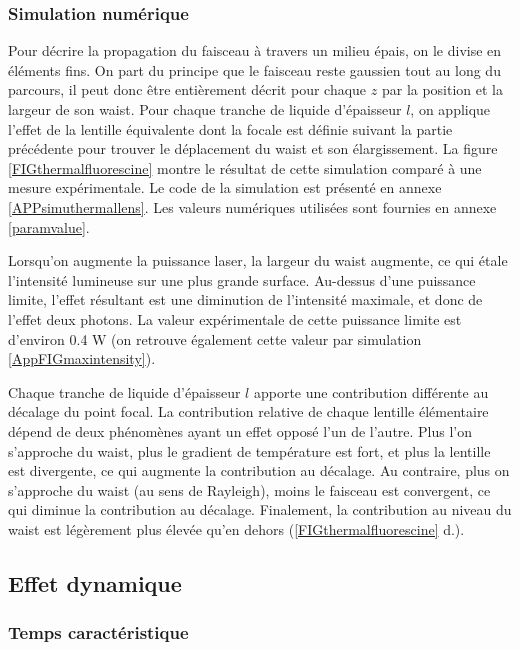 \subsubsection{Simulation numérique}\label{simuthermallens}

Pour décrire la propagation du faisceau à travers un milieu épais, on le divise en éléments fins.
On part du principe que le faisceau reste gaussien tout au long du parcours, il peut donc être entièrement décrit pour chaque $z$ par la position et la largeur de son waist. Pour chaque tranche de liquide d'épaisseur $l$, on applique l'effet de la lentille équivalente dont la focale est définie suivant la partie précédente pour trouver le déplacement du waist et son élargissement. La figure \ref{FIGthermalfluorescine} montre le résultat de cette simulation comparé à une mesure expérimentale. Le code de la simulation est présenté en annexe \ref{APPsimuthermallens}. Les valeurs numériques utilisées sont fournies en annexe \ref{paramvalue}.

Lorsqu'on augmente la puissance laser, la largeur du waist augmente, ce qui étale l'intensité lumineuse sur une plus grande surface. Au-dessus d'une puissance limite, l'effet résultant est une diminution de l'intensité maximale, et donc de l'effet deux photons. La valeur expérimentale de cette puissance limite est d'environ 0.4 W (on retrouve également cette valeur par simulation \ref{AppFIGmaxintensity}).

Chaque tranche de liquide d'épaisseur $l$ apporte une contribution différente au décalage du point focal. La contribution relative de chaque lentille élémentaire dépend de deux phénomènes ayant un effet opposé l'un de l'autre. Plus l'on s'approche du waist, plus le gradient de température est fort, et plus la lentille est divergente, ce qui augmente la contribution au décalage. Au contraire, plus on s'approche du waist (au sens de Rayleigh), moins le faisceau est convergent, ce qui diminue la contribution au décalage. Finalement, la contribution au niveau du waist est légèrement plus élevée qu'en dehors (\ref{FIGthermalfluorescine} d.).


\subsection{Effet dynamique}

\subsubsection{Temps caractéristique}


